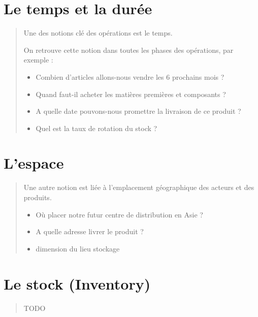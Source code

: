 \documentclass[letterpaper,10pt,french]{sphinxmanual}
\begin{document}
\section{Le temps et la durée}
\label{\detokenize{readthedocs/operations:le-temps-et-la-duree}}\begin{quote}

Une des notions clé des opérations est le temps.

On retrouve cette notion dans toutes les phases des opérations, par exemple :
\begin{itemize}
\item {} 
Combien d’articles allons-nous vendre les 6 prochains mois ?

\item {} 
Quand faut-il acheter les matières premières et composants ?

\item {} 
A quelle date pouvons-nous promettre la livraison de ce produit ?

\item {} 
Quel est la taux de rotation du stock ?

\end{itemize}
\end{quote}


\section{L’espace}
\label{\detokenize{readthedocs/operations:l-espace}}\begin{quote}

Une autre notion est liée à l’emplacement géographique des acteurs et des produits.
\begin{itemize}
\item {} 
Où placer notre futur centre de distribution en Asie ?

\item {} 
A quelle adresse livrer le produit ?

\item {} 
dimension du lieu stockage

\end{itemize}
\end{quote}


\section{Le stock (Inventory)}
\label{\detokenize{readthedocs/operations:le-stock-inventory}}\begin{quote}

TODO
\end{quote}
\end{document}
